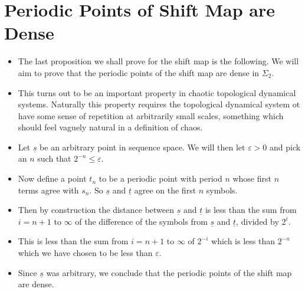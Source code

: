 \documentclass{article}
\begin{document}
    \section{Periodic Points of Shift Map are Dense}
    \begin{itemize}
        \item The last proposition we shall prove for the shift map is the following. We will aim to prove that the periodic points of the shift map are dense in $\Sigma_2$.
        \item This turns out to be an important property in chaotic topological dynamical systems. Naturally this property requires the topological dynamical system ot have some sense of repetition at arbitrarily small scales, something which should feel vaguely natural in a definition of chaos.
        \item Let $\underline{s}$ be an arbitrary point in sequence space. We will then let $\varepsilon > 0$ and pick an $n$ such that $2^{-n} \leq \varepsilon$.
        \item Now define a point $t_n$ to be a periodic point with period $n$ whose first $n$ terms agree with $s_n$. So $\underline{s}$ and $\underline{t}$ agree on the first $n$ symbols.
        \item Then by construction the distance between $\underline{s}$ and $\underline{t}$ is less than the sum from $i = n+1$ to $\infty$ of the difference of the symbols from $\underline{s}$ and $\underline{t}$, divided by $2^i$.
        \item This is less than the sum from $i = n+1$ to $\infty$ of $2^{-i}$ which is less than $2^{-n}$ which we have chosen to be less than $\varepsilon$.
        \item Since $\underline{s}$ was arbitrary, we conclude that the periodic points of the shift map are dense.
    \end{itemize}
\end{document}
